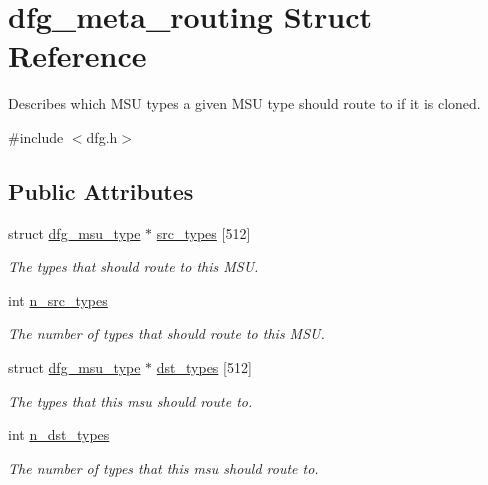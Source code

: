 \hypertarget{structdfg__meta__routing}{\section{dfg\-\_\-meta\-\_\-routing Struct Reference}
\label{structdfg__meta__routing}
}


Describes which M\-S\-U types a given M\-S\-U type should route to if it is cloned.  




{\ttfamily \#include $<$dfg.\-h$>$}

\subsection*{Public Attributes}
\begin{DoxyCompactItemize}
\item 
struct \hyperlink{structdfg__msu__type}{dfg\-\_\-msu\-\_\-type} $\ast$ \hyperlink{structdfg__meta__routing_afee7eace401506a5212d4dfd2fafbfcf}{src\-\_\-types} \mbox{[}512\mbox{]}
\begin{DoxyCompactList}\small\item\em The types that should route to this M\-S\-U. \end{DoxyCompactList}\item 
int \hyperlink{structdfg__meta__routing_adb2586e29348fe1efe970f56cfe4a789}{n\-\_\-src\-\_\-types}
\begin{DoxyCompactList}\small\item\em The number of types that should route to this M\-S\-U. \end{DoxyCompactList}\item 
struct \hyperlink{structdfg__msu__type}{dfg\-\_\-msu\-\_\-type} $\ast$ \hyperlink{structdfg__meta__routing_a33011fd118a329e61f37c05a6d094f7d}{dst\-\_\-types} \mbox{[}512\mbox{]}
\begin{DoxyCompactList}\small\item\em The types that this msu should route to. \end{DoxyCompactList}\item 
int \hyperlink{structdfg__meta__routing_a70780c9f090459860034252dfa139808}{n\-\_\-dst\-\_\-types}
\begin{DoxyCompactList}\small\item\em The number of types that this msu should route to. \end{DoxyCompactList}\end{DoxyCompactItemize}


